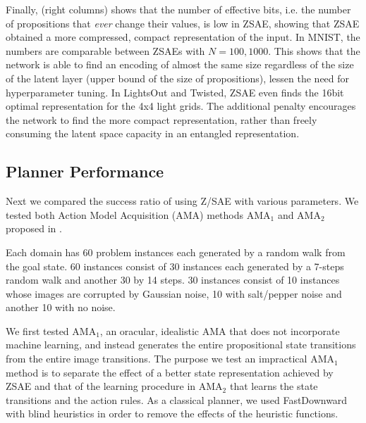 Finally,  (right columns) shows that the number of effective bits,
i.e. the number of propositions that \emph{ever} change their values, is low in ZSAE, showing that
ZSAE obtained a more compressed, compact representation of the input.
In MNIST, the numbers are comparable between ZSAEs with $N=100,1000$.
This shows that the network is able to find an encoding of almost the same size
regardless of the size of the latent layer (upper bound of the size of
propositions), lessen the need for hyperparameter tuning.
In LightsOut and Twisted, ZSAE even finds the 16bit optimal representation for the 4x4 light grids.
The additional
penalty encourages the network to find the more compact representation,
rather than freely consuming the latent space capacity in an entangled representation.


\subsection{Planner Performance}

Next we compared the success ratio of \latentplanner using Z/SAE with various parameters.
We tested both Action Model Acquisition (AMA) methods AMA$_1$ and AMA$_2$ proposed in \cite{Asai2018}.

Each domain has 60 problem instances each generated by a random walk from
the goal state. 60 instances consist of 30 instances each generated by a 7-steps random walk
and another 30 by 14 steps. 30 instances consist of 10 instances whose images are corrupted by Gaussian noise,
10 with salt/pepper noise and another 10 with no noise.

We first tested AMA$_1$, an oracular, idealistic AMA that does not incorporate machine learning,
and instead generates the entire propositional state transitions from the entire image transitions.
The purpose we test an impractical AMA$_1$ method is
to separate the effect of a better state representation achieved by ZSAE
and that of the learning procedure in AMA$_2$ that learns the state transitions and the action rules.
As a classical planner, we used FastDownward \cite{Helmert04} with blind heuristics in order to
remove the effects of the heuristic functions.


